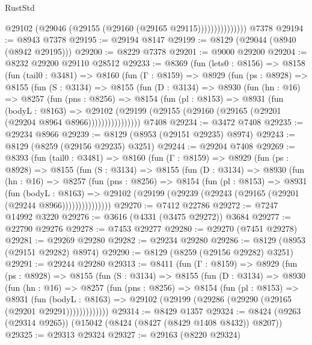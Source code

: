 \begin{lexlean}{RustStd}
\begin{coremodule}
                        @29102 (@29046 (@29155 (@29160 (@29165 @29115)))))))))))))))
    @7378
@29194 := @8943 @7378
@29195 := @29194 @8147
@29199 := @8129 (@29044 (@8940 (@8942 @29195)))
@29200 := @8229 @7378
@29201 := @9000 @29200
@29204 := @8232 @29200 @29110 @28512
@29233 := @8369
    (fun (lets0 : @8156) =>
    @8158
      (fun (tail0 : @3481) =>
      @8160
        (fun (Γ : @8159) =>
        @8929
          (fun (ps : @8928) =>
          @8155
            (fun (S : @3134) =>
            @8155
              (fun (D : @3134) =>
              @8930
                (fun (hn : @16) =>
                @8257
                  (fun (pns : @8256) =>
                  @8154
                    (fun (pl : @8153) =>
                    @8931
                      (fun (bodyL : @8163) =>
                      @29102
                        (@29199 (@29155 (@29160 (@29165 (@29201 (@29204 @8964 @8966))))))))))))))))
    @7408
@29234 := @3472 @7408
@29235 := @29234 @8966
@29239 := @8129 (@8953 (@29151 @29235) @8974)
@29243 := @8129 (@8259 (@29156 @29235) @3251)
@29244 := @29204 @7408
@29269 := @8393
    (fun (tail0 : @3481) =>
    @8160
      (fun (Γ : @8159) =>
      @8929
        (fun (ps : @8928) =>
        @8155
          (fun (S : @3134) =>
          @8155
            (fun (D : @3134) =>
            @8930
              (fun (hn : @16) =>
              @8257
                (fun (pns : @8256) =>
                @8154
                  (fun (pl : @8153) =>
                  @8931
                    (fun (bodyL : @8163) =>
                    @29102 (@29199 (@29239 (@29243 (@29165 (@29201 (@29244 @8966)))))))))))))))
@29270 := @7412 @22786
@29272 := @7247 @14992 @3220
@29276 := @3616 (@4331 (@3475 @29272)) @3684
@29277 := @22790 @29276
@29278 := @7453 @29277
@29280 := @29270 (@7451 @29278)
@29281 := @29269 @29280
@29282 := @29234 @29280
@29286 := @8129 (@8953 (@29151 @29282) @8974)
@29290 := @8129 (@8259 (@29156 @29282) @3251)
@29291 := @29244 @29280
@29313 := @8411
    (fun (Γ : @8159) =>
    @8929
      (fun (ps : @8928) =>
      @8155
        (fun (S : @3134) =>
        @8155
          (fun (D : @3134) =>
          @8930
            (fun (hn : @16) =>
            @8257
              (fun (pns : @8256) =>
              @8154
                (fun (pl : @8153) =>
                @8931
                  (fun (bodyL : @8163) =>
                  @29102 (@29199 (@29286 (@29290 (@29165 (@29201 @29291)))))))))))))
@29314 := @8429 @1357
@29324 := @8424 (@9263 (@29314 @9265)) (@15042 (@8424 (@8427 (@8429 @1408 @8432)) @8207))
@29325 := @29313 @29324
@29327 := @29163 (@8220 @29324)

\end{coremodule}
\end{lexlean}
